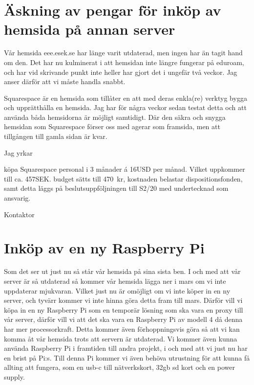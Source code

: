 \documentclass[10pt]{article}
\def\doctype{Handlingar} %
\def\mname{Styrelsemöte} %
\def\mnum{S1/20} %
\begin{document}
    
    \heading{{\doctype} till {\mname} {\mnum}}
    
    \section*{Äskning av pengar för inköp av hemsida på annan server}
    
 	Vår hemsida eee.esek.se har länge varit utdaterad, men ingen har än tagit hand om den. Det har nu kulminerat i att hemsidan inte längre fungerar på eduroam, och har vid skrivande punkt inte heller har gjort det i ungefär två veckor. Jag anser därför att vi måste handla snabbt. 
 	
 	Squarespace är en hemsida som tillåter en att med deras enkla(re) verktyg bygga och upprätthålla en hemsida. Jag har för några veckor sedan testat detta och att använda båda hemsidorna är möjligt samtidigt. Där den säkra och snygga hemsidan som Squarespace förser oss med agerar som framsida, men att tillgången till gamla sidan är kvar.
 	

Jag yrkar 


   \begin{attsatser}
        \att köpa Squarespace personal i 3 månader á 16USD per månad. Vilket uppkommer till ca. 457SEK. 
        \att budget sätts till \SI{470}{kr},
        \att kostnaden belastar dispositionsfonden, samt
        \att detta läggs på beslutsuppföljningen till S2/20 med undertecknad som ansvarig. 
    \end{attsatser}
    
    
    \begin{signatures}{1}
    \textit{\ist}
    \signature{Hannes Björk}{Kontaktor}
    \end{signatures}
    
\newpage
\section*{Inköp av en ny Raspberry Pi}
    
 	Som det ser ut just nu så står vår hemsida på sina sista ben. I och med att vår server är så utdaterad så kommer vår hemsida lägga ner i mars om vi inte uppdaterar mjukvaran. Vilket just nu är omöjligt om vi inte köper in en ny server, och tyvärr kommer vi inte hinna göra detta fram till mars. Därför vill vi köpa in en ny Raspberry Pi som en temporär lösning som ska vara en proxy till vår server, därför vill vi att det ska vara en Raspberry Pi av modell 4 då denna har mer processorkraft. Detta kommer även förhoppningsvis göra så att vi kan komma åt vår hemsida trots att servern är utdaterad. Vi kommer även kunna använda Raspberry Pi i framtiden till andra projekt, i och med att vi just nu har en brist på Pi:s. Till denna Pi kommer vi även behöva utrustning för att kunna få allting att fungera, som en usb-c till nätverkskort, 32gb sd kort och en power supply.  
 	
\end{document}
